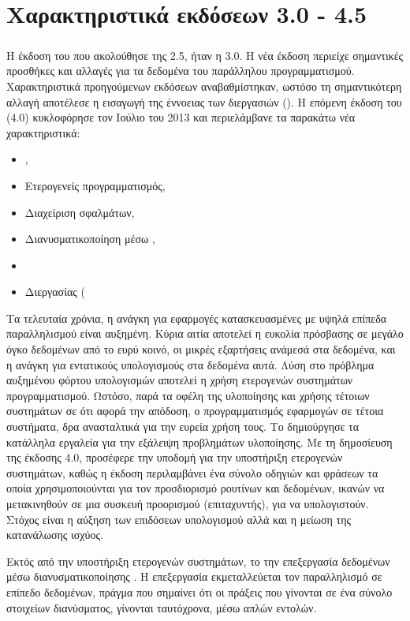\section{Χαρακτηριστικά εκδόσεων  3.0 - 4.5}
\subparagraph{}
Η έκδοση του \emph{} που ακολούθησε της 2.5, ήταν η 3.0. Η νέα έκδοση περιείχε σημαντικές προσθήκες και αλλαγές για τα δεδομένα του παράλληλου προγραμματισμού. Χαρακτηριστικά προηγούμενων εκδόσεων αναβαθμίστηκαν, ωστόσο τη σημαντικότερη αλλαγή αποτέλεσε η εισαγωγή της έννοειας των διεργασιών (\emph{}). Η επόμενη έκδοση του \emph{} (4.0) κυκλοφόρησε τον Ιούλιο του 2013 και περιελάμβανε τα παρακάτω νέα χαρακτηριστικά:

\begin{itemize}
    \item \emph{},
    \item Ετερογενείς προγραμματισμός,
    \item Διαχείριση σφαλμάτων,
    \item Διανυσματικοποίηση μέσω \emph{},
    \item \emph{}
    \item Διεργασίας (\emph{}
\end{itemize}

Τα τελευταία χρόνια, η ανάγκη για εφαρμογές κατασκευασμένες με υψηλά επίπεδα παραλληλισμού είναι αυξημένη. Κύρια αιτία αποτελεί η ευκολία πρόσβασης σε μεγάλο όγκο δεδομένων από το ευρύ κοινό, οι μικρές εξαρτήσεις ανάμεσά στα δεδομένα, και η ανάγκη για εντατικούς υπολογισμούς στα δεδομένα αυτά. 
Λύση στο πρόβλημα αυξημένου φόρτου υπολογισμών αποτελεί η χρήση ετερογενών συστημάτων προγραμματισμού. 
Ωστόσο, παρά τα οφέλη της υλοποίησης και χρήσης τέτοιων συστημάτων σε ότι αφορά την απόδοση, ο προγραμματισμός εφαρμογών σε τέτοια συστήματα, δρα ανασταλτικά για την ευρεία χρήση τους. 
Το \emph{} δημιούργησε τα κατάλληλα εργαλεία για την εξάλειψη προβλημάτων υλοποίησης. Με τη δημοσίευση της έκδοσης 4.0, προσέφερε την υποδομή για την υποστήριξη ετερογενών συστημάτων, καθώς η έκδοση περιλαμβάνει ένα σύνολο οδηγιών και φράσεων τα οποία χρησιμοποιούνται για τον προσδιορισμό ρουτίνων και δεδομένων, ικανών να μετακινηθούν σε μια συσκευή προορισμού (επιταχυντής), για να υπολογιστούν. Στόχος είναι η αύξηση των επιδόσεων υπολογισμού αλλά και η μείωση της κατανάλωσης ισχύος. 

Εκτός από την υποστήριξη ετερογενών συστημάτων, το \emph{} την επεξεργασία δεδομένων μέσω διανυσματικοποίησης \emph{}. Η επεξεργασία \emph{} εκμεταλλεύεται τον παραλληλισμό σε επίπεδο δεδομένων, πράγμα που σημαίνει ότι οι πράξεις που γίνονται σε ένα σύνολο στοιχείων διανύσματος, γίνονται ταυτόχρονα, μέσω απλών εντολών.

